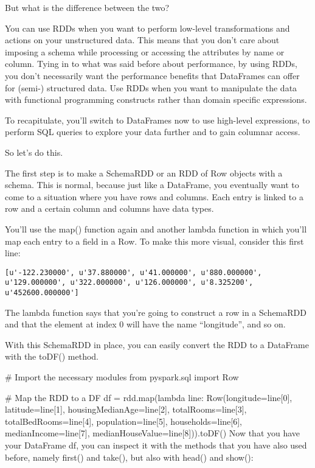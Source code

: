 \documentclass[a4paper,12pt]{article}
\begin{document}
But what is the difference between the two?

You can use RDDs when you want to perform low-level transformations and actions on your unstructured data. This means that you don’t care about imposing a schema while processing or accessing the attributes by name or column. Tying in to what was said before about performance, by using RDDs, you don’t necessarily want the performance benefits that DataFrames can offer for (semi-) structured data. Use RDDs when you want to manipulate the data with functional programming constructs rather than domain specific expressions.

To recapitulate, you’ll switch to DataFrames now to use high-level expressions, to perform SQL queries to explore your data further and to gain columnar access.

So let’s do this.

The first step is to make a SchemaRDD or an RDD of Row objects with a schema. This is normal, because just like a DataFrame, you eventually want to come to a situation where you have rows and columns. Each entry is linked to a row and a certain column and columns have data types.

You’ll use the map() function again and another lambda function in which you’ll map each entry to a field in a Row. To make this more visual, consider this first line:
\begin{verbatim}
[u'-122.230000', u'37.880000', u'41.000000', u'880.000000', u'129.000000', u'322.000000', u'126.000000', u'8.325200', u'452600.000000']    
\end{verbatim}

The lambda function says that you’re going to construct a row in a SchemaRDD and that the element at index 0 will have the name “longitude”, and so on.

With this SchemaRDD in place, you can easily convert the RDD to a DataFrame with the toDF() method.

# Import the necessary modules 
from pyspark.sql import Row

# Map the RDD to a DF
df = rdd.map(lambda line: Row(longitude=line[0], 
                              latitude=line[1], 
                              housingMedianAge=line[2],
                              totalRooms=line[3],
                              totalBedRooms=line[4],
                              population=line[5], 
                              households=line[6],
                              medianIncome=line[7],
                              medianHouseValue=line[8])).toDF()
Now that you have your DataFrame df, you can inspect it with the methods that you have also used before, namely first() and take(), but also with head() and show():
\end{document}
